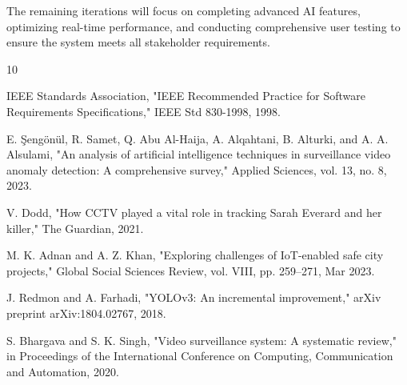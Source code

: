 \documentclass[12pt,a4paper]{article}
\begin{document}
The remaining iterations will focus on completing advanced AI features, optimizing real-time performance, and conducting comprehensive user testing to ensure the system meets all stakeholder requirements.

\clearpage


\begin{thebibliography}{10}

IEEE Standards Association, "IEEE Recommended Practice for Software Requirements Specifications," IEEE Std 830-1998, 1998.

E. Şengönül, R. Samet, Q. Abu Al-Haija, A. Alqahtani, B. Alturki, and A. A. Alsulami, "An analysis of artificial intelligence techniques in surveillance video anomaly detection: A comprehensive survey," Applied Sciences, vol. 13, no. 8, 2023.

V. Dodd, "How CCTV played a vital role in tracking Sarah Everard and her killer," The Guardian, 2021.

M. K. Adnan and A. Z. Khan, "Exploring challenges of IoT-enabled safe city projects," Global Social Sciences Review, vol. VIII, pp. 259–271, Mar 2023.

J. Redmon and A. Farhadi, "YOLOv3: An incremental improvement," arXiv preprint arXiv:1804.02767, 2018.

S. Bhargava and S. K. Singh, "Video surveillance system: A systematic review," in Proceedings of the International Conference on Computing, Communication and Automation, 2020.

\end{thebibliography}
\end{document}
